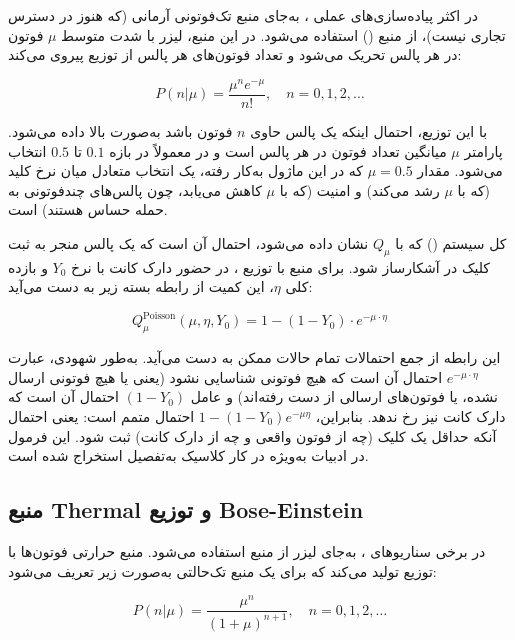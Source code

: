 در اکثر پیاده‌سازی‌های عملی ، به‌جای منبع تک‌فوتونی آرمانی (که هنوز در دسترس تجاری نیست)، از منبع  () استفاده می‌شود. در این منبع، لیزر با شدت متوسط $\mu$ فوتون در هر پالس تحریک می‌شود و تعداد فوتون‌های هر پالس از توزیع  پیروی می‌کند:

\begin{equation}
	P(n | \mu) = \frac{\mu^n e^{-\mu}}{n!}, \quad n = 0, 1, 2, \ldots
\end{equation}

با این توزیع، احتمال اینکه یک پالس حاوی $n$ فوتون باشد به‌صورت بالا داده می‌شود. پارامتر $\mu$ میانگین تعداد فوتون در هر پالس است و در  معمولاً در بازه $0.1$ تا $0.5$ انتخاب می‌شود. مقدار $\mu = 0.5$ که در این ماژول به‌کار رفته، یک انتخاب متعادل میان نرخ کلید (که با $\mu$ رشد می‌کند) و امنیت (که با $\mu$ کاهش می‌یابد، چون پالس‌های چندفوتونی به حمله  حساس هستند) است.

 کل سیستم () که با $Q_\mu$ نشان داده می‌شود، احتمال آن است که یک پالس منجر به ثبت کلیک در آشکارساز شود. برای منبع  با توزیع ، در حضور دارک کانت با نرخ $Y_0$ و بازده کلی $\eta$، این کمیت از رابطه بسته زیر به دست می‌آید:

\begin{equation}
	Q_\mu^{\text{Poisson}}(\mu, \eta, Y_0) = 1 - (1 - Y_0) \cdot e^{-\mu \cdot \eta}
\end{equation}

این رابطه از جمع احتمالات تمام حالات ممکن به دست می‌آید. به‌طور شهودی، عبارت $e^{-\mu \cdot \eta}$ احتمال آن است که هیچ فوتونی شناسایی نشود (یعنی یا هیچ فوتونی ارسال نشده، یا فوتون‌های ارسالی از دست رفته‌اند) و عامل $(1 - Y_0)$ احتمال آن است که دارک کانت نیز رخ ندهد. بنابراین، $1 - (1-Y_0) e^{-\mu \eta}$ احتمال متمم است: یعنی احتمال آنکه حداقل یک کلیک (چه از فوتون واقعی و چه از دارک کانت) ثبت شود. این فرمول در ادبیات  به‌ویژه در کار کلاسیک  به‌تفصیل استخراج شده است.

\subsection{منبع Thermal و توزیع Bose-Einstein}

در برخی سناریوهای ، به‌جای لیزر  از منبع  استفاده می‌شود. منبع حرارتی فوتون‌ها با توزیع  تولید می‌کند که برای یک منبع تک‌حالتی به‌صورت زیر تعریف می‌شود:

\begin{equation}
	P(n | \mu) = \frac{\mu^n}{(1 + \mu)^{n+1}}, \quad n = 0, 1, 2, \ldots
\end{equation}

